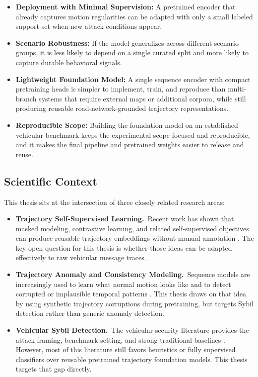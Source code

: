 \documentclass[12pt]{article}
\begin{document}
\begin{itemize}
    \item \textbf{Deployment with Minimal Supervision:} A pretrained encoder that already captures motion regularities can be adapted with only a small labeled support set when new attack conditions appear.

    \item \textbf{Scenario Robustness:} If the model generalizes across different scenario groups, it is less likely to depend on a single curated split and more likely to capture durable behavioral signals.

    \item \textbf{Lightweight Foundation Model:} A single sequence encoder with compact pretraining heads is simpler to implement, train, and reproduce than multi-branch systems that require external maps or additional corpora, while still producing reusable road-network-grounded trajectory representations.

    \item \textbf{Reproducible Scope:} Building the foundation model on an established vehicular benchmark keeps the experimental scope focused and reproducible, and it makes the final pipeline and pretrained weights easier to release and reuse.
\end{itemize}

\subsection{Scientific Context}

This thesis sits at the intersection of three closely related research areas:

\begin{itemize}
    \item \textbf{Trajectory Self-Supervised Learning.}~Recent work has shown that masked modeling, contrastive learning, and related self-supervised objectives can produce reusable trajectory embeddings without manual annotation \cite{jiang2023start,chen2023self,lin2023pre}. The key open question for this thesis is whether those ideas can be adapted effectively to raw vehicular message traces.

    \item \textbf{Trajectory Anomaly and Consistency Modeling.}~Sequence models are increasingly used to learn what normal motion looks like and to detect corrupted or implausible temporal patterns \cite{chen2023self,jiang2023start}. This thesis draws on that idea by using synthetic trajectory corruptions during pretraining, but targets Sybil detection rather than generic anomaly detection.

    \item \textbf{Vehicular Sybil Detection.}~The vehicular security literature provides the attack framing, benchmark setting, and strong traditional baselines \cite{so2018integrating,yao2019multi,baza2022detecting,azam2022collaborative,zhou2011p2dap,van2018veremi,van2020veremi}. However, most of this literature still favors heuristics or fully supervised classifiers over reusable pretrained trajectory foundation models. This thesis targets that gap directly.
\end{itemize}
\end{document}
